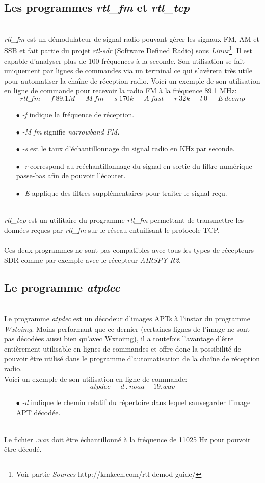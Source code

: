 \documentclass[12pt,fleqn]{book} %
\begin{document}
\subsection{Les programmes \emph{rtl\_fm} et \emph{rtl\_tcp}}
~\\\indent \emph{rtl\_fm} est un démodulateur de signal radio pouvant gérer les signaux FM, AM et SSB et fait partie du projet \emph{rtl-sdr} (Software Defined Radio) sous \emph{Linux}\footnote{Voir partie \emph{Sources} http://kmkeen.com/rtl-demod-guide/}. Il est capable d'analyser plus de 100 fréquences à la seconde. Son utilisation se fait uniquement par lignes de commandes via un terminal ce qui s'avèrera très utile pour automatiser la chaîne de réception radio.
Voici un exemple de son utilisation en ligne de commande pour recevoir la radio FM à la fréquence 89.1 MHz:
$$ rtl\_fm\ -f\ 89.1M\ -M\ fm\ -s\ 170k\ -A\ fast\ -r\ 32k\ -l\ 0\ -E\ deemp $$
\begin{itemize}
 \item[$\bullet$] \emph{-f} indique la fréquence de réception.
 \item[$\bullet$] \emph{-M fm} signifie \emph{narrowband FM}.
 \item[$\bullet$] \emph{-s} est le taux d'échantillonnage du signal radio en KHz par seconde.
 \item[$\bullet$] \emph{-r} correspond au reéchantillonnage du signal en sortie du filtre numérique passe-bas afin de pouvoir l'écouter.
 \item[$\bullet$] \emph{-E} applique des filtres supplémentaires pour traiter le signal reçu.
\end{itemize}
~\\\emph{rtl\_tcp} est un utilitaire du programme \emph{rtl\_fm} permettant de transmettre les données reçues par \emph{rtl\_fm} sur le réseau entuilisant le protocole TCP.
~\\\\Ces deux programmes ne sont pas compatibles avec tous les types de récepteurs SDR comme par exemple avec le récepteur \emph{AIRSPY-R2}. 
\subsection{Le programme \emph{atpdec}}
~\\\indent Le programme \emph{atpdec} est un décodeur d'images APTs à l'instar du programme \emph{Wxtoimg}. Moins performant que ce dernier (certaines lignes de l'image ne sont pas décodées aussi bien qu'avec Wxtoimg), il a toutefois l'avantage d'être entièrement utilisable en lignes de commandes et offre donc la possibilité de pouvoir être utilisé dans le programme d'automatisation de la chaîne de réception radio.
~\\Voici un exemple de son utilisation en ligne de commande:
$$ atpdec\ -d\ .\ noaa-19.wav $$
\begin{itemize}
 \item[$\bullet$] \emph{-d} indique le chemin relatif du répertoire dans lequel sauvegarder l'image APT décodée.
\end{itemize}
~\\Le fichier \emph{.wav} doit être échantillonné à la fréquence de 11025 Hz pour pouvoir être décodé.
\end{document}
